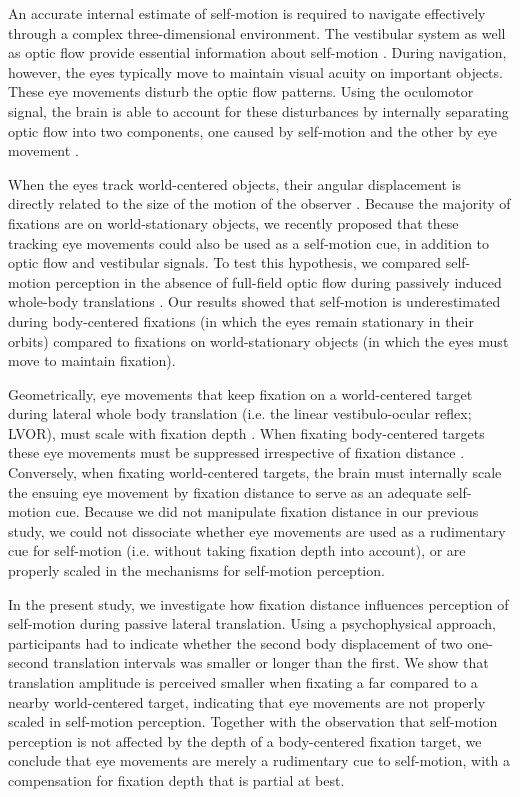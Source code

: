 An accurate internal estimate of self-motion is required to navigate effectively through a complex three-dimensional environment. The vestibular system as well as optic flow provide essential information about self-motion \cite{gibson1955, benson1986, harris2000, israel1989, angelaki2005, carriot2013, chen2010}. During navigation, however, the eyes typically move to maintain visual acuity on important objects. These eye movements disturb the optic flow patterns. Using the oculomotor signal, the brain is able to account for these disturbances by internally separating optic flow into two components, one caused by self-motion and the other by eye movement \cite{warren1988, royden1992, freeman1998, lappe1999}.

When the eyes track world-centered objects, their angular displacement is directly related to the size of the motion of the observer \cite{schwarz1989, paige1998, mchenry2000, medendorp2002}. Because  the majority of fixations are on world-stationary  objects, we recently proposed that these tracking eye movements could also be used as a self-motion cue, in addition to optic flow and vestibular signals. To test this hypothesis, we compared self-motion perception in the absence of full-field optic flow during passively induced whole-body translations \cite{clemens2015a}. Our results showed that self-motion is underestimated during body-centered fixations (in which the eyes remain stationary in their orbits) compared to fixations on world-stationary objects (in which the eyes must move to maintain fixation).

Geometrically, eye movements that keep fixation on a world-centered target during lateral whole body translation (i.e. the linear vestibulo-ocular reflex; LVOR), must scale with fixation depth \cite{angelaki2004}. When fixating body-centered targets these eye movements must be suppressed irrespective of fixation distance \cite{angelaki2004}. Conversely, when fixating world-centered targets, the brain must internally scale the ensuing eye movement by fixation distance to serve as an adequate self-motion cue. Because we did not manipulate fixation distance in our previous study, we could not dissociate whether eye movements are used as a rudimentary cue for self-motion (i.e. without taking fixation depth into account), or are properly scaled in the mechanisms for self-motion perception.

In the present study, we investigate how fixation distance influences perception of self-motion during passive lateral translation. Using a psychophysical approach, participants had to indicate whether the second body displacement of two one-second translation intervals was smaller or longer than the first. We show that translation amplitude is perceived smaller when fixating a far compared to a nearby world-centered target, indicating that eye movements are not properly scaled in self-motion perception. Together with the observation that self-motion perception is not affected by the depth of a body-centered fixation target, we conclude that eye movements are merely a rudimentary cue to self-motion, with a compensation for fixation depth that is partial at best.



